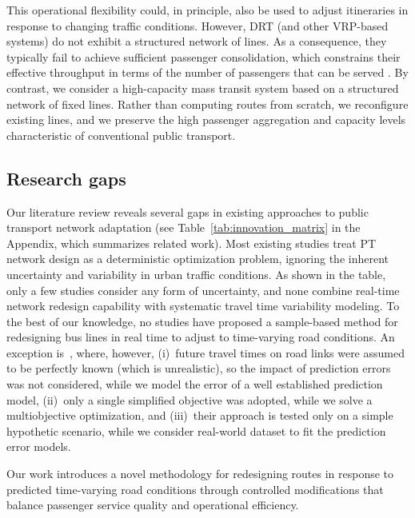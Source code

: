 \documentclass[a4paper,fleqn]{cas-sc}
\begin{document}
This operational flexibility could, in principle, also be used to adjust itineraries in response to changing traffic conditions. However, DRT (and other VRP-based systems) do not exhibit a structured network of lines. As a consequence, they typically fail to achieve sufficient passenger consolidation, which constrains their effective throughput in terms of the number of passengers that can be served \citep{Calabro2022}. By contrast, we consider a high-capacity mass transit system based on a structured network of fixed lines. Rather than computing routes from scratch, we reconfigure existing lines, and we preserve the high passenger aggregation and capacity levels characteristic of conventional public transport.


\subsection{Research gaps}
Our literature review reveals several gaps in existing approaches to public transport network adaptation (see Table~\ref{tab:innovation_matrix} in the Appendix, which summarizes related work).
%
Most existing studies treat PT network design as a deterministic optimization problem, ignoring the inherent uncertainty and variability in urban traffic conditions. As shown in the table, only a few studies consider any form of uncertainty, and none combine real-time network redesign capability with systematic travel time variability modeling.
%
To the best of our knowledge, no studies have proposed a sample-based method for redesigning bus lines in real time to adjust to time-varying road conditions. An exception is~\citet{guo2025data}, where, however, (i)~future travel times on road links were assumed to be perfectly known (which is unrealistic), so the impact of prediction errors was not considered, while we model the error of a well established prediction model, (ii)~only a single simplified objective was adopted, while we solve a multiobjective optimization, and (iii)~their approach is tested only on a simple hypothetic scenario, while we consider real-world dataset to fit the prediction error models.

Our work introduces a novel methodology for redesigning routes in response to predicted time-varying road conditions through controlled modifications that balance passenger service quality and operational efficiency.

\end{document}
